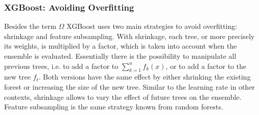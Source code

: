 \subsubsection{XGBoost: Avoiding Overfitting}
Besides the term $\Omega$ XGBoost uses two main strategies to avoid overfitting: shrinkage and feature subsampling. With shrinkage, each tree, or more precisely its weights, is multiplied by a factor, which is taken into account when the ensemble is evaluated. Essentially there is the possibility to manipulate all previous trees, i.e. to add a factor to $\sum\limits_{k=1}^n f_k(x)$, or to add a factor to the new tree $f_t$. Both versions have the same effect by either shrinking the existing forest or increasing the size of the new tree. Similar to the learning rate in other contexts, shrinkage allows to vary the effect of future trees on the ensemble. Feature subsampling is the same strategy known from random forests.

